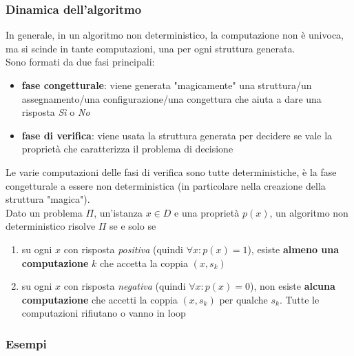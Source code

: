 \subsubsection{Dinamica dell'algoritmo}

In generale, in un algoritmo non deterministico, la computazione non è univoca, ma si scinde in tante computazioni, una per ogni struttura generata.\\

Sono formati da due fasi principali: 
\begin{itemize}
	\item \textbf{fase congetturale}: viene generata "magicamente" una struttura/un assegnamento/una configurazione/una congettura che aiuta a dare una risposta \textit{Sì} o \textit{No}
	\item \textbf{fase di verifica}: viene usata la struttura generata per decidere se vale la proprietà che caratterizza il problema di decisione
\end{itemize}

Le varie computazioni delle fasi di verifica sono tutte deterministiche, è la fase congetturale a essere non deterministica (in particolare nella creazione della struttura "magica").\\

Dato un problema $\Pi$, un'istanza $x \in D$ e una proprietà $p(x)$, un algoritmo non deterministico risolve $\Pi$ se e solo se
\begin{enumerate}
	\item su ogni $x$ con risposta \textit{positiva} (quindi $\forall x: p(x) = 1$), esiste \textbf{almeno una computazione} $k$ che accetta la coppia $(x, s_k)$
	\item su ogni $x$ con risposta \textit{negativa} (quindi $\forall x: p(x) = 0$), non esiste \textbf{alcuna computazione} che accetti la coppia $(x, s_k)$ per qualche $s_k$. Tutte le computazioni rifiutano o vanno in loop
\end{enumerate}

\subsubsection{Esempi}

